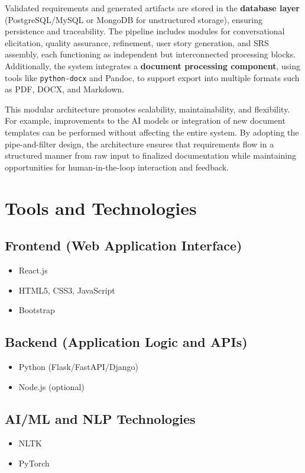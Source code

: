 Validated requirements and generated artifacts are stored in the \textbf{database layer} (PostgreSQL/MySQL or MongoDB for unstructured storage), ensuring persistence and traceability. The pipeline includes modules for conversational elicitation, quality assurance, refinement, user story generation, and SRS assembly, each functioning as independent but interconnected processing blocks. Additionally, the system integrates a \textbf{document processing component}, using tools like \texttt{python-docx} and Pandoc, to support export into multiple formats such as PDF, DOCX, and Markdown.

This modular architecture promotes scalability, maintainability, and flexibility. For example, improvements to the AI models or integration of new document templates can be performed without affecting the entire system. By adopting the pipe-and-filter design, the architecture ensures that requirements flow in a structured manner from raw input to finalized documentation while maintaining opportunities for human-in-the-loop interaction and feedback.
\section{Tools and Technologies}

\subsection*{Frontend (Web Application Interface)}
\begin{itemize}
    \item React.js  
    \item HTML5, CSS3, JavaScript 
    \item Bootstrap  
\end{itemize}

\subsection*{Backend (Application Logic and APIs)}
\begin{itemize}
    \item Python (Flask/FastAPI/Django)
    \item Node.js (optional)
\end{itemize}

\subsection*{AI/ML and NLP Technologies}
\begin{itemize}
    \item NLTK 
    \item PyTorch 
\end{itemize}

